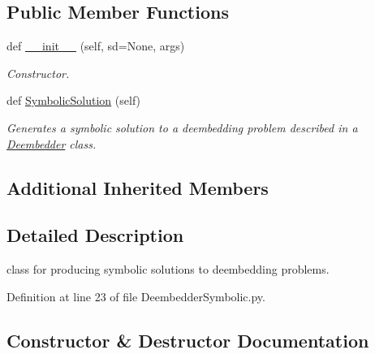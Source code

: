 \subsection*{Public Member Functions}
\begin{DoxyCompactItemize}
\item 
def \hyperlink{classSignalIntegrity_1_1SystemDescriptions_1_1DeembedderSymbolic_1_1DeembedderSymbolic_a72fa31992e716f60779f561f6cdbb4ce}{\+\_\+\+\_\+init\+\_\+\+\_\+} (self, sd=None, args)
\begin{DoxyCompactList}\small\item\em Constructor. \end{DoxyCompactList}\item 
def \hyperlink{classSignalIntegrity_1_1SystemDescriptions_1_1DeembedderSymbolic_1_1DeembedderSymbolic_a10ef812418fff67deff1540435a9698c}{Symbolic\+Solution} (self)
\begin{DoxyCompactList}\small\item\em Generates a symbolic solution to a deembedding problem described in a \hyperlink{namespaceSignalIntegrity_1_1SystemDescriptions_1_1Deembedder}{Deembedder} class. \end{DoxyCompactList}\end{DoxyCompactItemize}
\subsection*{Additional Inherited Members}


\subsection{Detailed Description}
class for producing symbolic solutions to deembedding problems. 

Definition at line 23 of file Deembedder\+Symbolic.\+py.



\subsection{Constructor \& Destructor Documentation}
\mbox{\label{classSignalIntegrity_1_1SystemDescriptions_1_1DeembedderSymbolic_1_1DeembedderSymbolic_a72fa31992e716f60779f561f6cdbb4ce}} 
